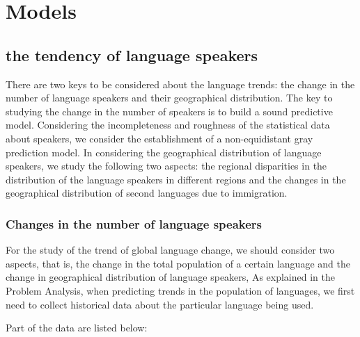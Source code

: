 \section{Models}

\subsection{the tendency of language speakers}
\noindent There are two keys to be considered about the language trends: the change in the number of language speakers and their geographical distribution. The key to studying the change in the number of speakers is to build a sound predictive model. Considering the incompleteness and roughness of the statistical data about speakers, we consider the establishment of a non-equidistant gray prediction model. In considering the geographical distribution of language speakers, we study the following two aspects: the regional disparities in the distribution of the language speakers in different regions and the changes in the geographical distribution of second languages due to immigration.

\subsubsection{Changes in the number of language speakers}
\noindent For the study of the trend of global language change, we should consider two aspects, that is, the change in the total population of a certain language and the change in geographical distribution of language speakers, As explained in the Problem Analysis, when predicting trends in the population of languages, we first need to collect historical data about the particular language being used.
\par Part of the data are listed below: 

